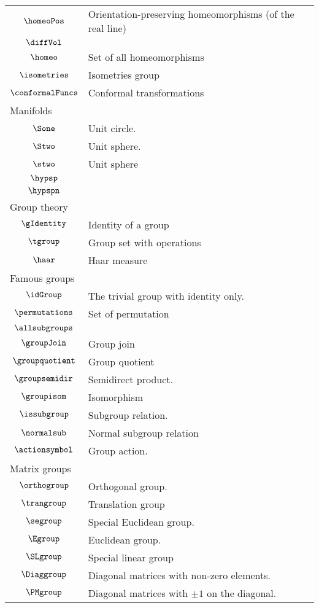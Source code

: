 \begin{longtable}{cl}
 $\homeoPos$ &  Orientation-preserving homeomorphisms (of the real line)\\ 
 $\diffVol$ & \\ 
 $\homeo$ &  Set of all homeomorphisms\\ 
 $\isometries$ &  Isometries group\\ 
 $\conformalFuncs$ &  Conformal transformations\\ 
 \multicolumn{2}{l}{Manifolds}\\ 
 \hline
$\Sone$ &  Unit circle.\\ 
 $\Stwo$ &  Unit sphere.\\ 
 $\stwo$ &  Unit sphere\\ 
 $\hypsp$ & \\ 
 $\hypspn$ & \\ 
 \multicolumn{2}{l}{Group theory}\\ 
 \hline
$\gIdentity$ &  Identity of a group\\ 
 $\tgroup$ &  Group set with operations\\ 
 $\haar$ &  Haar measure\\ 
 \multicolumn{2}{l}{Famous groups}\\ 
 \hline
$\idGroup$ &  The trivial group with identity only.\\ 
 $\permutations$ &  Set of permutation\\ 
 $\allsubgroups$ & \\ 
 $\groupJoin$ &  Group join\\ 
 $\groupquotient$ &  Group quotient\\ 
 $\groupsemidir$ &  Semidirect product.\\ 
 $\groupisom$ &  Isomorphism\\ 
 $\issubgroup$ &  Subgroup relation.\\ 
 $\normalsub$ &  Normal subgroup relation\\ 
 $\actionsymbol$ &  Group action.\\ 
 \multicolumn{2}{l}{Matrix groups}\\ 
 \hline
$\orthogroup$ &  Orthogonal group.\\ 
 $\trangroup$ &   Translation group\\ 
 $\segroup$ &  Special Euclidean group.\\ 
 $\Egroup$ &   Euclidean group.\\ 
 $\SLgroup$ &   Special linear group\\ 
 $\Diaggroup$ &   Diagonal matrices with non-zero elements.\\ 
 $\PMgroup$ &   Diagonal matrices with $\pm 1$ on the diagonal.\\ 

\end{longtable}
